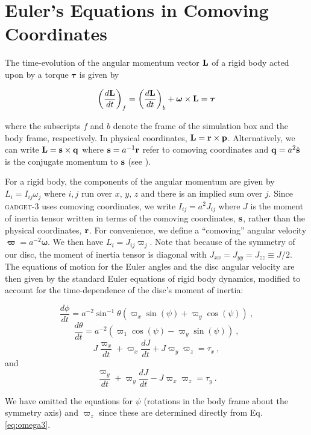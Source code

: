 \appendix

\chapter{Euler's Equations in Comoving Coordinates} \label{sec:derivation}

The time-evolution of the angular momentum vector ${\bf L}$ of a rigid
body acted upon by a torque $\boldsymbol{\tau}$ is given by

\begin{equation}
  \left(\frac{{d} \bf{L}}{{d} t}\right)_f = \left(\frac{{d} \bf{L}}{{d} t}\right)_b  + \boldsymbol \omega \times \bf{L}
  = \boldsymbol{\tau}
\end{equation}

\noindent where the subscripts $f$ and $b$ denote the frame of the
simulation box and the body frame, respectively.  In physical
coordinates, ${\bf L} = {\bf r \times p}$.  Alternatively, we can
write ${\bf L} = {\bf s\times q}$ where ${\bf s} = a^{-1}{\bf r}$
refer to comoving coordinates and ${\bf q} = a^2\dot{\bf s}$ is the
conjugate momentum to ${\bf s}$ (see \citet{QuinnIntegrators}).

For a rigid body, the components of the angular momentum are given by $L_i = I_{ij} \omega_j$ where $i,j$ run over $x,\,y,\,z$ and there is an implied sum over $j$.  Since \textsc{gadget-3} uses comoving coordinates, we write $I_{ij} = a^2 J_{ij}$ where $J$ is the moment of inertia tensor written in terms of the comoving coordinates, ${\bf s}$, rather than the physical coordinates, ${\bf r}$.  For convenience, we define a ``comoving'' angular velocity $\boldsymbol{\varpi} = a^{-2}\boldsymbol{\omega}$.  We then have $L_i = J_{ij} \varpi_j$.  Note that because of the symmetry of our disc, the moment of inertia tensor is diagonal with $J_{xx} = J_{yy}= J_{zz} \equiv J/2$.  The equations of motion for the Euler angles and the disc angular velocity are then given by the standard Euler equations of rigid body dynamics, modified to account for the time-dependence of the disc's moment of inertia:

\begin{equation}
\frac{d\phi}{dt} = a^{-2}\sin^{-1}{\theta} \left (\varpi_x\sin(\psi) + \varpi_y \cos(\psi)\right )~,
\end{equation}
\begin{equation}
\frac{d\theta}{dt} = a^{-2}\left (  \varpi_1\cos(\psi) - \varpi_y \sin(\psi)\right )~,
\end{equation}
\begin{equation}
J\frac{\varpi_x}{dt} + \varpi_x\frac{dJ}{dt}
+ J\varpi_y\varpi_z
=  \tau_x~,
\end{equation}
and
\begin{equation}
\frac{\varpi_y}{dt} + \varpi_y\frac{dJ}{dt}
- J\varpi_x\varpi_z
=  \tau_y~.
\end{equation}

\noindent We have omitted the equations for $\psi$ (rotations in the body frame about the symmetry axis) and $\varpi_z$ since these are determined directly from Eq.\,\ref{eq:omega3}.   
